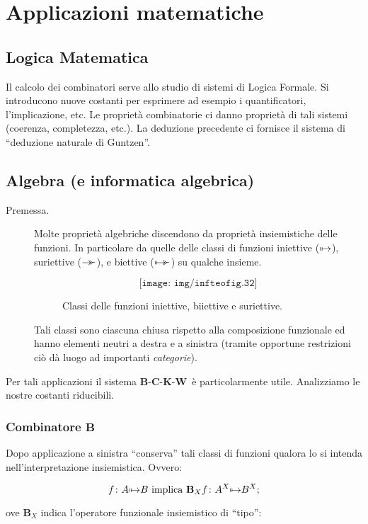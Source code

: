 \documentclass{book}
\newcommand*{\KK}{$\mathbf{K}$}    %
\newcommand*{\CC}{$\mathbf{C}$}    %
\newcommand*{\BB}{$\mathbf{B}$}    %
\newcommand*{\WW}{$\mathbf{W}$}    %
\newcommand*{\bb}{\mathbf{B}}    %
\def\ddp{\hbox{\kern-.5em\lower.63ex\hbox{${}^\succ$}}}
\def\bijection{\mbox{$\mapstochar\,\mapsto\ddp$}}
\def\surjection{\mbox{$\to\ddp$}}
\def\injection{\mbox{$\mapstochar\,\mapsto$}}
\begin{document}
\chapter{Applicazioni matematiche}

\section{Logica Matematica} Il calcolo dei combinatori serve allo studio di 
sistemi di Logica Formale. Si introducono nuove costanti per esprimere ad 
esempio i quantificatori, l'implicazione, etc. Le propriet\`a combinatorie 
ci danno propriet\`a di tali sistemi (coerenza, completezza, etc.). 
La deduzione precedente ci fornisce il sistema di ``deduzione naturale di 
Guntzen''.
\section{Algebra (e informatica algebrica)}
\begin{description}
\item[Premessa.]Molte propriet\`a algebriche discendono da propriet\`a 
insiemistiche delle funzioni. In particolare da quelle delle classi di funzioni
iniettive (\injection), suriettive (\surjection), e biettive (\bijection) su
qualche insieme.

\begin{figure}
\[ \texttt{[image: img/infteofig.32]} \]
\caption{Classi delle funzioni iniettive, biiettive e suriettive.}
\end{figure} 
Tali classi sono ciascuna chiusa rispetto alla composizione funzionale ed hanno
elementi neutri a destra e a sinistra (tramite opportune restrizioni ci\`o d\`a
luogo ad importanti \emph{categorie}).
\end{description}
Per tali applicazioni il sistema \BB-\CC-\KK-\WW~\`e particolarmente utile.
Analizziamo le nostre costanti riducibili.

\subsection{Combinatore \BB}
Dopo applicazione a sinistra ``conserva'' tali classi di 
funzioni qualora lo si intenda nell'interpretazione insiemistica. Ovvero:

\[
f \colon A \injection B \text{ implica } \bb_X f \colon A^X \injection B^X;
\]

ove $\bb_X$ indica l'operatore funzionale insiemistico di ``tipo'':
\end{document}

